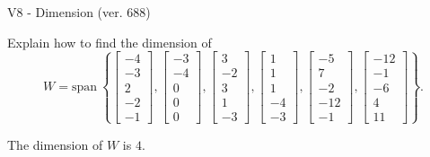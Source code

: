 \begin{exercise}
  \begin{exerciseTitle}V8 - Dimension (ver. 688)\end{exerciseTitle}
  \begin{exerciseStatement}
    Explain how to find the dimension of 
\[W=\mathrm{span}\ \left\{\left[\begin{array}{r}
-4 \\
-3 \\
2 \\
-2 \\
-1
\end{array}\right] , \left[\begin{array}{r}
-3 \\
-4 \\
0 \\
0 \\
0
\end{array}\right] , \left[\begin{array}{r}
3 \\
-2 \\
3 \\
1 \\
-3
\end{array}\right] , \left[\begin{array}{r}
1 \\
1 \\
1 \\
-4 \\
-3
\end{array}\right] , \left[\begin{array}{r}
-5 \\
7 \\
-2 \\
-12 \\
-1
\end{array}\right] , \left[\begin{array}{r}
-12 \\
-1 \\
-6 \\
4 \\
11
\end{array}\right]\right\}.\]



  \end{exerciseStatement}
  \begin{exerciseAnswer}
   The dimension of \(W\) is  \(4\).
  


  \end{exerciseAnswer}
\end{exercise}